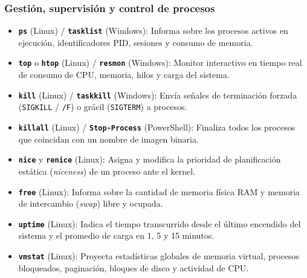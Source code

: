 \documentclass[12pt]{article}
\begin{document}
\subsubsection{Gestión, supervisión y control de procesos}
\begin{itemize}[leftmargin=*, noitemsep, topsep=2pt]
    \item \textbf{\texttt{ps}} (Linux) / \textbf{\texttt{tasklist}} (Windows): Informa sobre los procesos activos en ejecución, identificadores PID, sesiones y consumo de memoria.
    \item \textbf{\texttt{top}} o \textbf{\texttt{htop}} (Linux) / \textbf{\texttt{resmon}} (Windows): Monitor interactivo en tiempo real de consumo de CPU, memoria, hilos y carga del sistema.
    \item \textbf{\texttt{kill}} (Linux) / \textbf{\texttt{taskkill}} (Windows): Envía señales de terminación forzada (\texttt{SIGKILL} / \texttt{/F}) o grácil (\texttt{SIGTERM}) a procesos.
    \item \textbf{\texttt{killall}} (Linux) / \textbf{\texttt{Stop-Process}} (PowerShell): Finaliza todos los procesos que coincidan con un nombre de imagen binaria.
    \item \textbf{\texttt{nice}} y \textbf{\texttt{renice}} (Linux): Asigna y modifica la prioridad de planificación estática (\textit{niceness}) de un proceso ante el kernel.
    \item \textbf{\texttt{free}} (Linux): Informa sobre la cantidad de memoria física RAM y memoria de intercambio (\textit{swap}) libre y ocupada.
    \item \textbf{\texttt{uptime}} (Linux): Indica el tiempo transcurrido desde el último encendido del sistema y el promedio de carga en 1, 5 y 15 minutos.
    \item \textbf{\texttt{vmstat}} (Linux): Proyecta estadísticas globales de memoria virtual, procesos bloqueados, paginación, bloques de disco y actividad de CPU.
\end{itemize}
\end{document}
